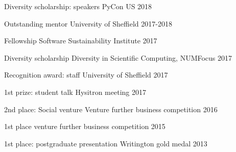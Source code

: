 




\begin{cvpress}

\cvpres
{Diversity scholarship: speakers} %
{PyCon US}
{2018}

\cvpres
{Outstanding mentor} %
{University of Sheffield}
{2017-2018}

\cvpres
{Fellowship} %
{Software Sustainability Institute}
{2017}

\cvpres
{Diversity scholarship} %
{Diversity in Scientific Computing, NUMFocus}
{2017}

\cvpres
{Recognition award: staff} %
{University of Sheffield}
{2017}


\cvpres
{1st prize: student talk}
{Hysitron meeting}
{2017}




\cvpres
{2nd place: Social venture}
{Venture further business competition}
{2016}



\cvpres
{1st place}
{venture further business competition}
{2015}



\cvpres
{1st place: postgraduate presentation}
{Writington gold medal}
{2013}





\end{cvpress}
